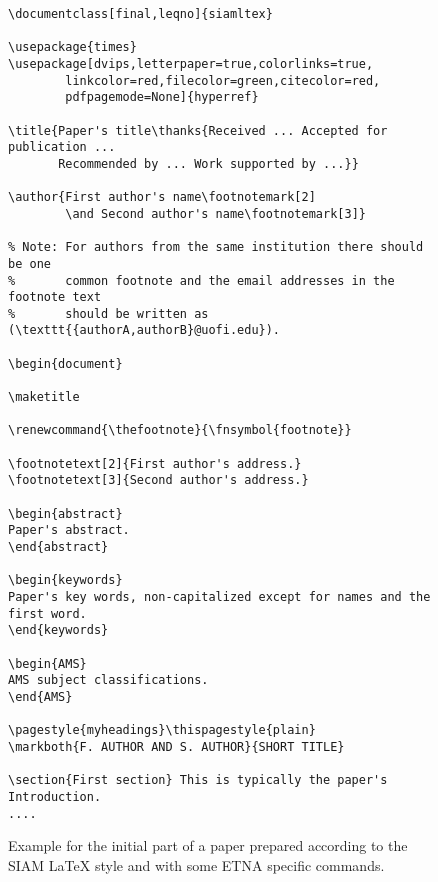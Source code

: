 \documentclass{scrartcl}
\begin{document}
\newpage
\begin{figure}
\begin{verbatim}
\documentclass[final,leqno]{siamltex}

\usepackage{times}
\usepackage[dvips,letterpaper=true,colorlinks=true,
        linkcolor=red,filecolor=green,citecolor=red,
        pdfpagemode=None]{hyperref}

\title{Paper's title\thanks{Received ... Accepted for publication ...
       Recommended by ... Work supported by ...}}

\author{First author's name\footnotemark[2]
        \and Second author's name\footnotemark[3]}

% Note: For authors from the same institution there should be one
%       common footnote and the email addresses in the footnote text
%       should be written as (\texttt{{authorA,authorB}@uofi.edu}).

\begin{document}

\maketitle

\renewcommand{\thefootnote}{\fnsymbol{footnote}}

\footnotetext[2]{First author's address.}
\footnotetext[3]{Second author's address.}

\begin{abstract}
Paper's abstract.
\end{abstract}

\begin{keywords}
Paper's key words, non-capitalized except for names and the first word.
\end{keywords}

\begin{AMS}
AMS subject classifications.
\end{AMS}

\pagestyle{myheadings}\thispagestyle{plain}
\markboth{F. AUTHOR AND S. AUTHOR}{SHORT TITLE}

\section{First section} This is typically the paper's Introduction.
....
\end{verbatim}
\caption{Example for the initial part of a paper prepared according to the
SIAM {\LaTeX} style and with some ETNA specific commands.}\label{fig:preamble}
\end{figure}
\end{document}

